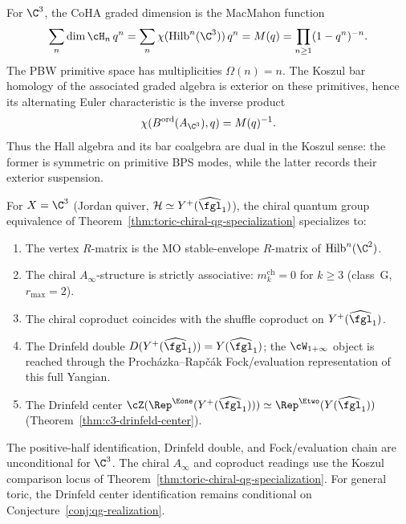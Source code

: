 \begin{remark}
\label{rem:coha-bar-macmahon}
For $\C^3$, the CoHA graded dimension is the MacMahon function
\[
 \sum_n \dim \cH_n\,q^n
 = \sum_n \chi(\mathrm{Hilb}^n(\C^3))\,q^n
 = M(q)
 = \prod_{n\geq 1}(1-q^n)^{-n}.
\]
The PBW primitive space has multiplicities \(\Omega(n)=n\). The Koszul
bar homology of the associated graded algebra is exterior on these
primitives, hence its alternating Euler characteristic is the inverse
product
\[
 \chi(B^{\mathrm{ord}}(A_{\C^3}),q)=M(q)^{-1}.
\]
Thus the Hall algebra and its bar coalgebra are dual in the Koszul
sense: the former is symmetric on primitive BPS modes, while the latter
records their exterior suspension.
\end{remark}

\begin{corollary}
\label{cor:c3-chiral-qg-triangle}
For $X = \C^3$ \textup{(}Jordan quiver,
$\mathcal{H} \simeq Y^+(\widehat{\fgl}_1)$\textup{)},
the chiral quantum group equivalence of
Theorem~\textup{\ref{thm:toric-chiral-qg-specialization}}
specializes to:
\begin{enumerate}[label=\textup{(\roman*)}]
 \item The vertex $R$-matrix is the MO stable-envelope
 $R$-matrix of $\mathrm{Hilb}^n(\C^2)$.
 \item The chiral $A_\infty$-structure is strictly
 associative: $m_k^{\mathrm{ch}} = 0$ for $k \geq 3$
 \textup{(}class~G, $r_{\max} = 2$\textup{)}.
 \item The chiral coproduct coincides with the
 shuffle coproduct on $Y^+(\widehat{\fgl}_1)$.
 \item The Drinfeld double
 $D(Y^+(\widehat{\fgl}_1)) = Y(\widehat{\fgl}_1)$; the
 $\cW_{1+\infty}$ object is reached through the
 Proch\'azka--Rap\v{c}\'ak Fock/evaluation representation of this full
 Yangian.
 \item The Drinfeld center
 $\cZ(\Rep^{\Eone}(Y^+(\widehat{\fgl}_1)))
 \simeq \Rep^{\Etwo}(Y(\widehat{\fgl}_1))$
 \textup{(}Theorem~\textup{\ref{thm:c3-drinfeld-center}}\textup{)}.
\end{enumerate}
The positive-half identification, Drinfeld double, and Fock/evaluation
chain are unconditional for $\C^3$. The chiral $A_\infty$ and coproduct
readings use the Koszul comparison locus of
Theorem~\ref{thm:toric-chiral-qg-specialization}. For general toric,
the Drinfeld center identification remains conditional on
Conjecture~\textup{\ref{conj:qg-realization}}.
\end{corollary}

